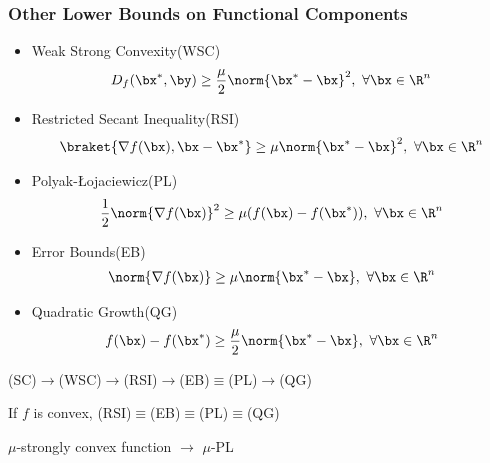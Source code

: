 \subsubsection{Other Lower Bounds on Functional Components}
\begin{itemize}
    \item Weak Strong Convexity(WSC) 
    \begin{align*}
        D_f(\bx^*,\by)\ge \frac{\mu}{2}\norm{\bx^*-\bx}^2,\ \forall \bx\in\R^n
    \end{align*}
    \item Restricted Secant Inequality(RSI)
    \begin{align*}
        \braket{\nabla f(\bx), \bx-\bx^*}\ge \mu\norm{\bx^*-\bx}^2,\ \forall \bx\in\R^n
    \end{align*}
    \item Polyak-Łojaciewicz(PL) 
    \begin{align*}
        \frac{1}{2}\norm{\nabla f(\bx)}^2\ge \mu (f(\bx)-f(\bx^*)),\ \forall \bx\in\R^n
    \end{align*}
    \item Error Bounds(EB)
    \begin{align*}
        \norm{\nabla f(\bx)}\ge \mu \norm{\bx^*-\bx},\ \forall \bx\in\R^n
    \end{align*}
    \item Quadratic Growth(QG)
    \begin{align*}
        f(\bx)-f(\bx^*)\ge \frac{\mu}{2}\norm{\bx^*-\bx},\ \forall \bx\in\R^n
    \end{align*}
\end{itemize}

(SC)$\to$(WSC)$\to$(RSI)$\to$(EB)$\equiv$(PL)$\to$(QG)

If $f$ is convex, (RSI)$\equiv$(EB)$\equiv$(PL)$\equiv$(QG)

\begin{theorem}
    $\mu$-strongly convex function $\to$ $\mu$-PL
\end{theorem}